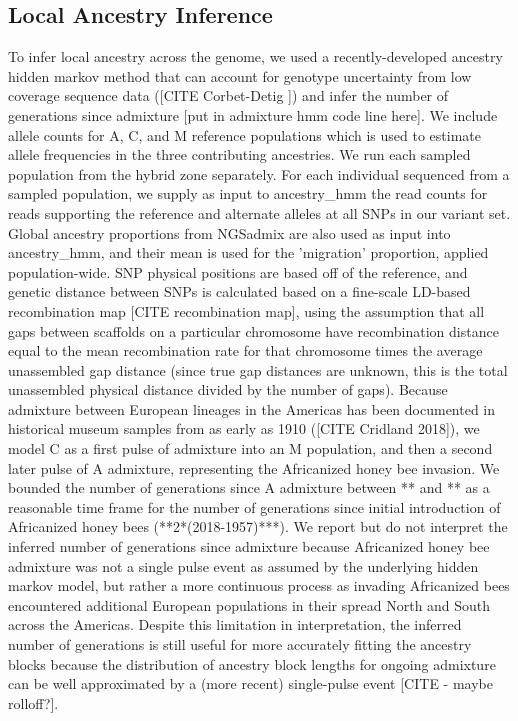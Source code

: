 \documentclass[12pt]{report}
\begin{document}
\subsection{Local Ancestry Inference}
To infer local ancestry across the genome, we used a recently-developed ancestry hidden markov method that can account for genotype uncertainty from low coverage sequence data ([CITE Corbet-Detig ]) and infer the number of generations since admixture [put in admixture hmm code line here]. We include allele counts for A, C, and M reference populations which is used to estimate allele frequencies in the three contributing ancestries. We run each sampled population from the hybrid zone separately. For each individual sequenced from a sampled population, we supply as input to ancestry\_hmm the read counts for reads supporting the reference and alternate alleles at all SNPs in our variant set. Global ancestry proportions from NGSadmix are also used as input into ancestry\_hmm, and their mean is used for the 'migration' proportion, applied population-wide. SNP physical positions are based off of the reference, and genetic distance between SNPs is calculated based on a fine-scale LD-based recombination map [CITE recombination map], using the assumption that all gaps between scaffolds on a particular chromosome have recombination distance equal to the mean recombination rate for that chromosome times the average unassembled gap distance (since true gap distances are unknown, this is the total unassembled physical distance divided by the number of gaps). Because admixture between European lineages in the Americas has been documented in historical museum samples from as early as 1910 ([CITE Cridland 2018]), we model C as a first pulse of admixture into an M population, and then a second later pulse of A admixture, representing the Africanized honey bee invasion. We bounded the number of generations since A admixture between ** and ** as a reasonable time frame for the number of generations since initial introduction of Africanized honey bees (**2*(2018-1957)***). We report but do not interpret the inferred number of generations since admixture because Africanized honey bee admixture was not a single pulse event as assumed by the underlying hidden markov model, but rather a more continuous process as invading Africanized bees encountered additional European populations in their spread North and South across the Americas. Despite this limitation in interpretation, the inferred number of generations is still useful for more accurately fitting the ancestry blocks because the distribution of ancestry block lengths for ongoing admixture can be well approximated by a (more recent) single-pulse event [CITE - maybe rolloff?]. \par
\end{document}

